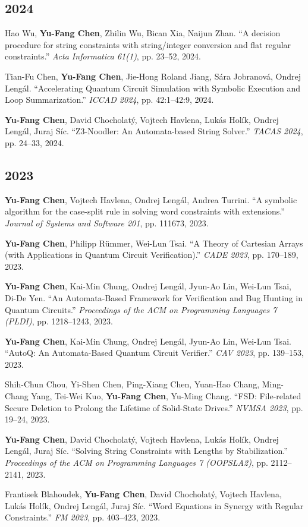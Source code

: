 \documentclass[10.5pt,a4paper]{article}
\begin{document}
\subsection*{2024}
\begin{enumerate}[leftmargin=*,label={[\arabic*]},resume]
\item Hao Wu, \textbf{Yu-Fang Chen}, Zhilin Wu, Bican Xia, Naijun Zhan. ``A decision procedure for string constraints with string/integer conversion and flat regular constraints.'' \emph{Acta Informatica 61(1)}, pp. 23--52, 2024.
\item Tian-Fu Chen, \textbf{Yu-Fang Chen}, Jie-Hong Roland Jiang, Sára Jobranová, Ondrej Lengál. ``Accelerating Quantum Circuit Simulation with Symbolic Execution and Loop Summarization.'' \emph{ICCAD 2024}, pp. 42:1--42:9, 2024.
\item \textbf{Yu-Fang Chen}, David Chocholatý, Vojtech Havlena, Lukás Holík, Ondrej Lengál, Juraj Síc. ``Z3-Noodler: An Automata-based String Solver.'' \emph{TACAS 2024}, pp. 24--33, 2024.
\end{enumerate}
\subsection*{2023}
\begin{enumerate}[leftmargin=*,label={[\arabic*]},resume]
\item \textbf{Yu-Fang Chen}, Vojtech Havlena, Ondrej Lengál, Andrea Turrini. ``A symbolic algorithm for the case-split rule in solving word constraints with extensions.'' \emph{Journal of Systems and Software 201}, pp. 111673, 2023.
\item \textbf{Yu-Fang Chen}, Philipp Rümmer, Wei-Lun Tsai. ``A Theory of Cartesian Arrays (with Applications in Quantum Circuit Verification).'' \emph{CADE 2023}, pp. 170--189, 2023.
\item \textbf{Yu-Fang Chen}, Kai-Min Chung, Ondrej Lengál, Jyun-Ao Lin, Wei-Lun Tsai, Di-De Yen. ``An Automata-Based Framework for Verification and Bug Hunting in Quantum Circuits.'' \emph{Proceedings of the ACM on Programming Languages 7 (PLDI)}, pp. 1218--1243, 2023.
\item \textbf{Yu-Fang Chen}, Kai-Min Chung, Ondrej Lengál, Jyun-Ao Lin, Wei-Lun Tsai. ``AutoQ: An Automata-Based Quantum Circuit Verifier.'' \emph{CAV 2023}, pp. 139--153, 2023.
\item Shih-Chun Chou, Yi-Shen Chen, Ping-Xiang Chen, Yuan-Hao Chang, Ming-Chang Yang, Tei-Wei Kuo, \textbf{Yu-Fang Chen}, Yu-Ming Chang. ``FSD: File-related Secure Deletion to Prolong the Lifetime of Solid-State Drives.'' \emph{NVMSA 2023}, pp. 19--24, 2023.
\item \textbf{Yu-Fang Chen}, David Chocholatý, Vojtech Havlena, Lukás Holík, Ondrej Lengál, Juraj Síc. ``Solving String Constraints with Lengths by Stabilization.'' \emph{Proceedings of the ACM on Programming Languages 7 (OOPSLA2)}, pp. 2112--2141, 2023.
\item Frantisek Blahoudek, \textbf{Yu-Fang Chen}, David Chocholatý, Vojtech Havlena, Lukás Holík, Ondrej Lengál, Juraj Síc. ``Word Equations in Synergy with Regular Constraints.'' \emph{FM 2023}, pp. 403--423, 2023.
\end{enumerate}
\end{document}
